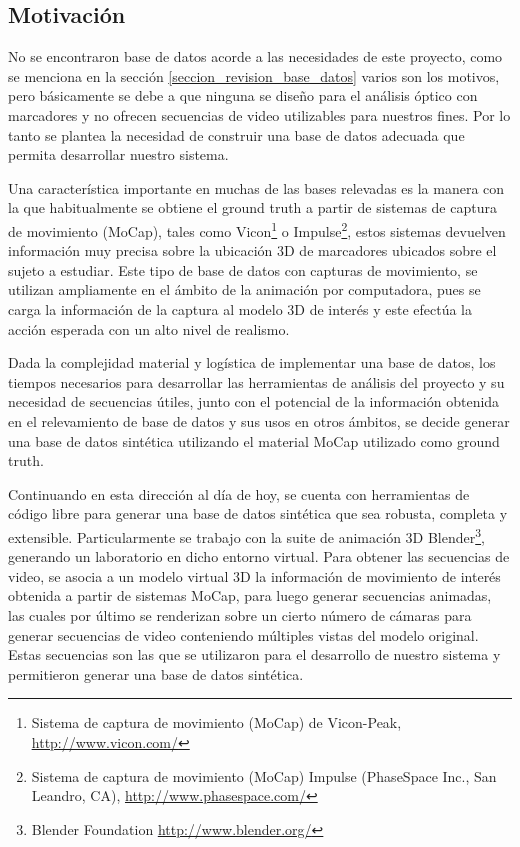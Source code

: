 \subsection{Motivación}

No se encontraron base de datos acorde a las necesidades de este proyecto, como se menciona en la sección \ref{seccion_revision_base_datos} varios son los motivos, pero básicamente se debe a que ninguna se diseño para el análisis óptico  con marcadores y no ofrecen secuencias de video utilizables para nuestros fines. Por lo tanto se plantea la necesidad de construir una base de datos adecuada que permita desarrollar nuestro sistema.


Una característica importante en muchas de las bases relevadas es la manera con la que habitualmente se obtiene el ground truth a partir de sistemas de captura de movimiento (MoCap), tales como Vicon\footnote{ Sistema  de captura de movimiento (MoCap) de Vicon-Peak, \textcolor{blue}{\underline{\url{http://www.vicon.com/}}} }
 o Impulse\footnote{ Sistema  de captura de movimiento (MoCap) Impulse (PhaseSpace Inc., San Leandro, CA), \textcolor{blue}{\underline{\url{http://www.phasespace.com/}}} },
estos sistemas devuelven información muy precisa sobre la ubicación 3D de marcadores ubicados sobre el sujeto a estudiar. Este tipo de base de datos con capturas de movimiento, se utilizan ampliamente en el ámbito de la animación por computadora, pues se carga la información de la captura al modelo 3D de interés y este efectúa la acción esperada con un alto nivel de realismo. 


Dada la complejidad material y logística de implementar una base de datos, los tiempos necesarios para desarrollar las herramientas de análisis del proyecto y su necesidad de secuencias útiles, junto con el potencial de la información obtenida en el relevamiento de base de datos y sus usos en otros ámbitos, se decide generar una base de datos sintética utilizando el material MoCap utilizado como ground truth.


Continuando en esta dirección al día de hoy, se cuenta con herramientas de código libre para generar una base de datos sintética que sea robusta, completa y extensible. Particularmente se trabajo con la suite de animación 3D Blender\footnote{ Blender Foundation \textcolor{blue}{\underline{\url{http://www.blender.org/}}}}, generando un laboratorio en dicho entorno virtual. Para obtener las secuencias de video, se asocia a un modelo  virtual 3D la información de movimiento de interés obtenida a partir de sistemas MoCap, para luego generar secuencias animadas, las cuales por último se renderizan sobre un cierto número de cámaras para generar secuencias de video conteniendo múltiples vistas del modelo original. Estas secuencias son las que se utilizaron para el desarrollo de nuestro sistema y permitieron generar una base de datos sintética. 


